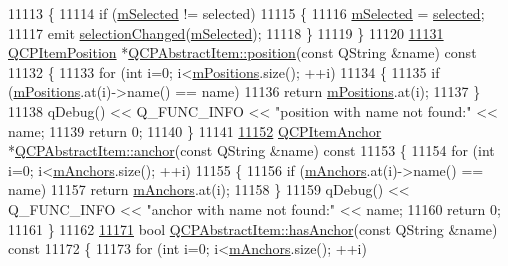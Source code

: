 \begin{DoxyCode}
11113 \{
11114   \textcolor{keywordflow}{if} (\hyperlink{a00022_a4bdb3457dad1d268c0f78a44152b9645}{mSelected} != selected)
11115   \{
11116     \hyperlink{a00022_a4bdb3457dad1d268c0f78a44152b9645}{mSelected} = \hyperlink{a00022_a225865808640d8d9a7dd19f09a2e93f2}{selected};
11117     emit \hyperlink{a00022_aa5cffb034fc65dbb91c77e02c1c14251}{selectionChanged}(\hyperlink{a00022_a4bdb3457dad1d268c0f78a44152b9645}{mSelected});
11118   \}
11119 \}
11120 
\hypertarget{a00115_source_l11131}{}\hyperlink{a00022_af71345bd150f87fa1d2442837b87bb59}{11131} \hyperlink{a00038}{QCPItemPosition} *\hyperlink{a00022_af71345bd150f87fa1d2442837b87bb59}{QCPAbstractItem::position}(\textcolor{keyword}{const} QString &name)\textcolor{keyword}{
       const}
11132 \textcolor{keyword}{}\{
11133   \textcolor{keywordflow}{for} (\textcolor{keywordtype}{int} i=0; i<\hyperlink{a00022_af94ff71b6a15ea6d028ab8bd8eccd012}{mPositions}.size(); ++i)
11134   \{
11135     \textcolor{keywordflow}{if} (\hyperlink{a00022_af94ff71b6a15ea6d028ab8bd8eccd012}{mPositions}.at(i)->name() == name)
11136       \textcolor{keywordflow}{return} \hyperlink{a00022_af94ff71b6a15ea6d028ab8bd8eccd012}{mPositions}.at(i);
11137   \}
11138   qDebug() << Q\_FUNC\_INFO << \textcolor{stringliteral}{"position with name not found:"} << name;
11139   \textcolor{keywordflow}{return} 0;
11140 \}
11141 
\hypertarget{a00115_source_l11152}{}\hyperlink{a00022_abed974cba7cc02608c71dad4638e008d}{11152} \hyperlink{a00032}{QCPItemAnchor} *\hyperlink{a00022_abed974cba7cc02608c71dad4638e008d}{QCPAbstractItem::anchor}(\textcolor{keyword}{const} QString &name)\textcolor{keyword}{ const}
11153 \textcolor{keyword}{}\{
11154   \textcolor{keywordflow}{for} (\textcolor{keywordtype}{int} i=0; i<\hyperlink{a00022_a909a3abab783de302ebf0a0e6f2bbc15}{mAnchors}.size(); ++i)
11155   \{
11156     \textcolor{keywordflow}{if} (\hyperlink{a00022_a909a3abab783de302ebf0a0e6f2bbc15}{mAnchors}.at(i)->name() == name)
11157       \textcolor{keywordflow}{return} \hyperlink{a00022_a909a3abab783de302ebf0a0e6f2bbc15}{mAnchors}.at(i);
11158   \}
11159   qDebug() << Q\_FUNC\_INFO << \textcolor{stringliteral}{"anchor with name not found:"} << name;
11160   \textcolor{keywordflow}{return} 0;
11161 \}
11162 
\hypertarget{a00115_source_l11171}{}\hyperlink{a00022_acbce9e5ba5252541d19db0c40303357a}{11171} \textcolor{keywordtype}{bool} \hyperlink{a00022_acbce9e5ba5252541d19db0c40303357a}{QCPAbstractItem::hasAnchor}(\textcolor{keyword}{const} QString &name)\textcolor{keyword}{ const}
11172 \textcolor{keyword}{}\{
11173   \textcolor{keywordflow}{for} (\textcolor{keywordtype}{int} i=0; i<\hyperlink{a00022_a909a3abab783de302ebf0a0e6f2bbc15}{mAnchors}.size(); ++i)

\end{DoxyCode}
